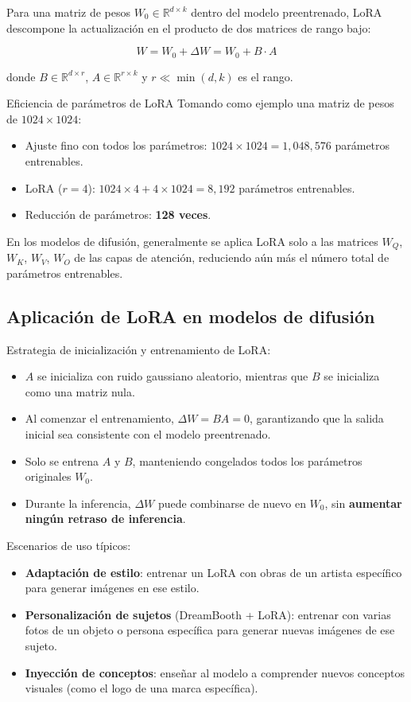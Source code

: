 \documentclass[a4paper]{article}
\begin{document}
Para una matriz de pesos $W_0 \in \mathbb{R}^{d \times k}$ dentro del modelo preentrenado, LoRA descompone la actualización en el producto de dos matrices de rango bajo:

$$
W = W_0 + \Delta W = W_0 + B \cdot A
$$

donde $B \in \mathbb{R}^{d \times r}$, $A \in \mathbb{R}^{r \times k}$ y $r \ll \min(d, k)$ es el rango.

\begin{importantbox}{Eficiencia de parámetros de LoRA}
Tomando como ejemplo una matriz de pesos de $1024 \times 1024$:
\begin{itemize}
    \item Ajuste fino con todos los parámetros: $1024 \times 1024 = 1,048,576$ parámetros entrenables.
    \item LoRA ($r=4$): $1024 \times 4 + 4 \times 1024 = 8,192$ parámetros entrenables.
    \item Reducción de parámetros: \textbf{128 veces}.
\end{itemize}
En los modelos de difusión, generalmente se aplica LoRA solo a las matrices $W_Q$, $W_K$, $W_V$, $W_O$ de las capas de atención, reduciendo aún más el número total de parámetros entrenables.
\end{importantbox}

\subsection{Aplicación de LoRA en modelos de difusión}

Estrategia de inicialización y entrenamiento de LoRA:

\begin{itemize}
    \item $A$ se inicializa con ruido gaussiano aleatorio, mientras que $B$ se inicializa como una matriz nula.
    \item Al comenzar el entrenamiento, $\Delta W = BA = 0$, garantizando que la salida inicial sea consistente con el modelo preentrenado.
    \item Solo se entrena $A$ y $B$, manteniendo congelados todos los parámetros originales $W_0$.
    \item Durante la inferencia, $\Delta W$ puede combinarse de nuevo en $W_0$, sin \textbf{aumentar ningún retraso de inferencia}.
\end{itemize}

Escenarios de uso típicos:
\begin{itemize}
    \item \textbf{Adaptación de estilo}: entrenar un LoRA con obras de un artista específico para generar imágenes en ese estilo.
    \item \textbf{Personalización de sujetos} (DreamBooth + LoRA): entrenar con varias fotos de un objeto o persona específica para generar nuevas imágenes de ese sujeto.
    \item \textbf{Inyección de conceptos}: enseñar al modelo a comprender nuevos conceptos visuales (como el logo de una marca específica).
\end{itemize}
\end{document}
